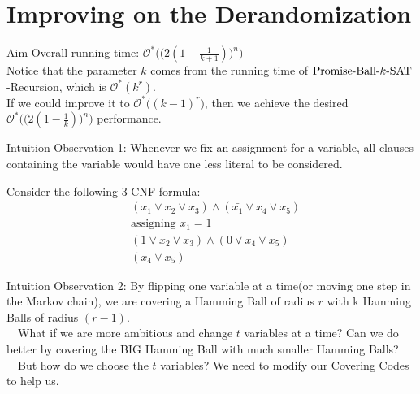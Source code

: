 \documentclass[pdf] {beamer}
\newcommand{\SAT}{\textnormal{$k$-SAT}}
\newcommand{\PBS}{\textnormal{Promise-Ball-$\SAT$}}
\renewcommand{\O}{\mathcal{O}^*}
\begin{document}
\section{Improving on the Derandomization}
	\begin{frame}{Aim}
	Overall running time: $\O\Big(\big(2(1-\frac{1}{k+1})\big)^n\Big)$\\
	Notice that the parameter $k$ comes from the running time of $\PBS$-Recursion, which is $\O(k^r)$.\\
	If we could improve it to $\O\big((k-1)^r\big)$, then we achieve the desired $\O\Big(\big(2(1-\frac{1}{k})\big)^n\Big)$ performance.
	\end{frame}
	\begin{frame}{Intuition}
	Observation 1: Whenever we fix an assignment for a variable, all clauses containing the variable would have one less literal to be considered. 
	\begin{example}
		Consider the following $3$-CNF formula:
	\begin{align*}
	&(x_1 \lor x_2 \lor x_3) \land (\bar{x_1} \lor x_4 \lor x_5)\\
	&\text{assigning }x_1 = 1\\
	&(1 \lor x_2 \lor x_3) \land (0 \lor x_4 \lor x_5)\\
	&(x_4 \lor x_5)
	\end{align*}
	\end{example}

	\end{frame}	
	\begin{frame}{Intuition}
	Observation 2: By flipping one variable at a time(or moving one step in the Markov chain), we are covering a Hamming Ball of radius $r$ with k Hamming Balls of radius $(r-1)$. \\~\
	What if we are more ambitious and change $t$ variables at a time? Can we do better by covering the BIG Hamming Ball with much smaller Hamming Balls? \\~\
	But how do we choose the $t$ variables? We need to modify our Covering Codes to help us.
	\end{frame}	
\end{document}
